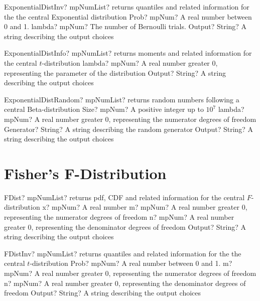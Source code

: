 \documentclass[12pt,a4paper,openany]{book}
\begin{document}
\begin{mpFunctionsExtract}
\mpFunctionThree
{ExponentialDistInv? mpNumList? returns quantiles and related information for the the central Exponential distribution}
{Prob? mpNum? A real number between 0 and 1.}
{lambda? mpNum? The number of Bernoulli trials.}
{Output? String? A string describing the output choices}
\end{mpFunctionsExtract}

\begin{mpFunctionsExtract}
\mpFunctionTwo
{ExponentialDistInfo? mpNumList? returns moments and related information for the central $t$-distribution}
{lambda? mpNum? A real number greater 0, representing the parameter of the distribution}
{Output? String? A string describing the output choices}
\end{mpFunctionsExtract}

\begin{mpFunctionsExtract}
\mpFunctionFour
{ExponentialDistRandom? mpNumList? returns random numbers following a central Beta-distribution}
{Size? mpNum? A positive integer up to $10^7$}
{lambda? mpNum? A real number greater 0, representing the numerator  degrees of freedom}
{Generator? String? A string describing the random generator}
{Output? String? A string describing the output choices}
\end{mpFunctionsExtract}

\section{Fisher's F-Distribution}

\begin{mpFunctionsExtract}
\mpFunctionFour
{FDist? mpNumList? returns pdf, CDF and related information for the central $F$-distribution}
{x? mpNum? A real number}
{m? mpNum? A real number greater 0, representing the numerator  degrees of freedom}
{n? mpNum? A real number greater 0, representing the denominator degrees of freedom}
{Output? String? A string describing the output choices}
\end{mpFunctionsExtract}

\begin{mpFunctionsExtract}
\mpFunctionThree
{FDistInv? mpNumList? returns quantiles and related information for the the central $t$-distribution}
{Prob? mpNum? A real number between 0 and 1.}
{m? mpNum? A real number greater 0, representing the numerator  degrees of freedom}
{n? mpNum? A real number greater 0, representing the denominator degrees of freedom}
{Output? String? A string describing the output choices}
\end{mpFunctionsExtract}
\end{document}

